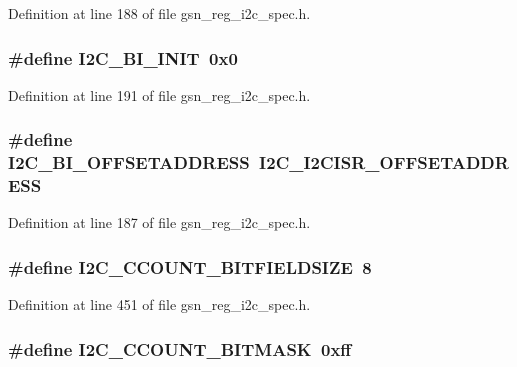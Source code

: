 Definition at line 188 of file gsn\_\-reg\_\-i2c\_\-spec.h.

\hypertarget{a00558_acb78c07404e9d15d281c95c99b40d4f4}{
\subsubsection[{I2C\_\-BI\_\-INIT}]{\setlength{\rightskip}{0pt plus 5cm}\#define I2C\_\-BI\_\-INIT~0x0}}
\label{a00558_acb78c07404e9d15d281c95c99b40d4f4}


Definition at line 191 of file gsn\_\-reg\_\-i2c\_\-spec.h.

\hypertarget{a00558_aff3b8a6a65e0e531fd4ebe376b1fed84}{
\subsubsection[{I2C\_\-BI\_\-OFFSETADDRESS}]{\setlength{\rightskip}{0pt plus 5cm}\#define I2C\_\-BI\_\-OFFSETADDRESS~I2C\_\-I2CISR\_\-OFFSETADDRESS}}
\label{a00558_aff3b8a6a65e0e531fd4ebe376b1fed84}


Definition at line 187 of file gsn\_\-reg\_\-i2c\_\-spec.h.

\hypertarget{a00558_a6af3a20aab2e1911c5984390e37e9063}{
\subsubsection[{I2C\_\-CCOUNT\_\-BITFIELDSIZE}]{\setlength{\rightskip}{0pt plus 5cm}\#define I2C\_\-CCOUNT\_\-BITFIELDSIZE~8}}
\label{a00558_a6af3a20aab2e1911c5984390e37e9063}


Definition at line 451 of file gsn\_\-reg\_\-i2c\_\-spec.h.

\hypertarget{a00558_a8ab61e97ce14317b4f30cc745ad834a4}{
\subsubsection[{I2C\_\-CCOUNT\_\-BITMASK}]{\setlength{\rightskip}{0pt plus 5cm}\#define I2C\_\-CCOUNT\_\-BITMASK~0xff}}
\label{a00558_a8ab61e97ce14317b4f30cc745ad834a4}


